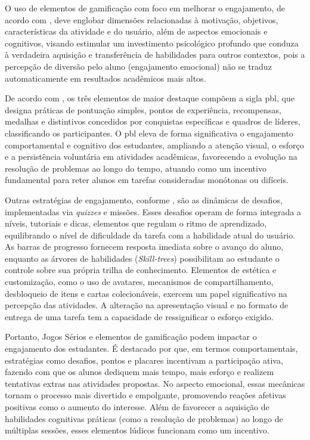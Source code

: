 O uso de elementos de gamificação com foco em melhorar o engajamento, de acordo
com  , deve englobar dimensões relacionadas à
motivação, objetivos, características da atividade e do usuário, além de
aspectos emocionais e cognitivos, visando estimular um investimento psicológico
profundo que conduza à verdadeira aquisição e transferência de habilidades para
outros contextos, pois a percepção de diversão pelo aluno (engajamento
emocional) não se traduz automaticamente em resultados acadêmicos mais altos.

De acordo com , os três elementos de maior
destaque compõem a sigla \gls{pbl}, que designa práticas
de pontuação simples, pontos de experiência, recompensas, medalhas e
distintivos concedidos por conquistas específicas e quadros de líderes,
classificando os participantes. O \gls{pbl} eleva de forma significativa o engajamento
comportamental e cognitivo dos estudantes, ampliando a atenção visual, o esforço
e a persistência voluntária em atividades acadêmicas, favorecendo a evolução na
resolução de problemas ao longo do tempo, atuando como um incentivo fundamental
para reter alunos em tarefas consideradas monótonas ou difíceis.

Outras estratégias de engajamento, conforme ,
são as dinâmicas de desafios, implementadas via \textit{quizzes} e missões.
Esses desafios operam de forma integrada a níveis, tutoriais e dicas, elementos
que regulam o ritmo de aprendizado, equilibrando o nível de dificuldade da
tarefa com a habilidade atual do usuário. As barras de progresso fornecem
resposta imediata sobre o avanço do aluno, enquanto as árvores de habilidades
(\textit{Skill-trees}) possibilitam ao estudante o controle sobre sua própria
trilha de conhecimento. Elementos de estética e customização, como o uso de
avatares, mecanismos de compartilhamento, desbloqueio de itens e cartas
colecionáveis, exercem um papel significativo na percepção das atividades. A
alteração na apresentação visual e no formato de entrega de uma tarefa tem a
capacidade de ressignificar o esforço exigido.

Portanto, Jogos Sérios e elementos de gamificação podem impactar o engajamento
dos estudantes. É destacado por  que, em
termos comportamentais, estratégias como desafios, pontos e placares incentivam
a participação ativa, fazendo com que os alunos dediquem mais tempo, mais
esforço e realizem tentativas extras nas atividades propostas. No aspecto
emocional, essas mecânicas tornam o processo mais divertido e empolgante,
promovendo reações afetivas positivas como o aumento do interesse. Além de
favorecer a aquisição de habilidades cognitivas práticas (como a resolução de
problemas) ao longo de múltiplas sessões, esses elementos lúdicos funcionam como
um incentivo.